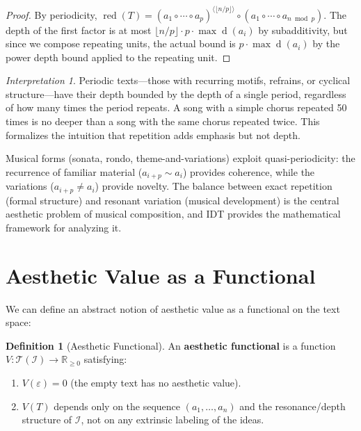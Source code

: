 \documentclass[11pt,openany]{book}
\theoremstyle{definition}
\newtheorem{definition}[axiom]{Definition}
\theoremstyle{plain}
\theoremstyle{remark}
\newtheorem{interpretation}[axiom]{Interpretation}
\newcommand{\IS}{\mathcal{I}}               %
\newcommand{\compose}{\circ}                 %
\newcommand{\res}{\sim}                      %
\newcommand{\depth}{\operatorname{d}}       %
\newcommand{\compN}[2]{#1^{\langle #2 \rangle}} %
\begin{document}
\begin{proof}
By periodicity, $\operatorname{red}(T) = \compN{(a_1 \compose \cdots \compose a_p)}{\lfloor n/p \rfloor} \compose (a_1 \compose \cdots \compose a_{n \bmod p})$. The depth of the first factor is at most $\lfloor n/p \rfloor \cdot p \cdot \max \depth(a_i)$ by subadditivity, but since we compose repeating units, the actual bound is $p \cdot \max \depth(a_i)$ by the power depth bound applied to the repeating unit.
\end{proof}

\begin{interpretation}
Periodic texts---those with recurring motifs, refrains, or cyclical structure---have their depth bounded by the depth of a single period, regardless of how many times the period repeats. A song with a simple chorus repeated 50 times is no deeper than a song with the same chorus repeated twice. This formalizes the intuition that repetition adds emphasis but not depth.

Musical forms (sonata, rondo, theme-and-variations) exploit quasi-periodicity: the recurrence of familiar material ($a_{i+p} \res a_i$) provides coherence, while the variations ($a_{i+p} \neq a_i$) provide novelty. The balance between exact repetition (formal structure) and resonant variation (musical development) is the central aesthetic problem of musical composition, and IDT provides the mathematical framework for analyzing it.
\end{interpretation}

\section{Aesthetic Value as a Functional}

We can define an abstract notion of aesthetic value as a functional on the text space:

\begin{definition}[Aesthetic Functional]
An \textbf{aesthetic functional} is a function $V : \mathcal{T}(\IS) \to \mathbb{R}_{\geq 0}$ satisfying:
\begin{enumerate}
\item $V(\varepsilon) = 0$ (the empty text has no aesthetic value).
\item $V(T)$ depends only on the sequence $(a_1, \ldots, a_n)$ and the resonance/depth structure of $\IS$, not on any extrinsic labeling of the ideas.
\end{enumerate}
\end{definition}
\end{document}

